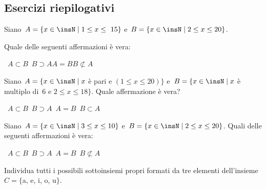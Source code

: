 \subsection{Esercizi riepilogativi}

\begin{esercizio}
\label{ese:\thechapter.92}
Siano~$A=\{x\in\insN\mid 1\le x\le~15\}$ e~$B=\{x\in\insN\mid 2\le x\le 20\}$.
\begin{center}

\end{center}
Quale delle seguenti affermazioni è vera:
\begin{center}
\boxA\quad~$A\subset B$\quad\boxB\quad~$B\supset A$\quad\boxC\quad$A=B$\quad\boxD\quad$B\not\subset A$
\end{center}
\end{esercizio}

\begin{esercizio}
\label{ese:\thechapter.93}
 Siano~$A=\{x\in\insN\mid x$ è pari e $(1\le x\le 20)\}$ e~$B=\{x\in\insN\mid x$ è multiplo di~6 e $2\le x\le 18\}$.
Quale affermazione è vera?
\begin{center}
 \boxA\quad~$A\subset B$\quad\boxB\quad~$B\supset A$\quad\boxC\quad~$A=B$\quad\boxD\quad~$B\subset A$
\end{center}
\end{esercizio}

\begin{esercizio}
\label{ese:\thechapter.94}
Siano~$A=\{x\in\insN\mid 3\le x\le 10\}$ e~$B=\{x\in\insN\mid 2\le x\le 20\}$.
Quali delle seguenti affermazioni è vera:
\begin{center}
 \boxA\quad~$A\subset B$\quad\boxB\quad~$B\supset A$\quad\boxC\quad~$A=B$\quad\boxD\quad~$B\not\subset A$
\end{center}
\end{esercizio}

\begin{esercizio}
\label{ese:\thechapter.95}
Individua tutti i possibili sottoinsiemi propri formati da tre elementi dell'insieme~$C=\{$a, e, i, o, u$\}$.
\end{esercizio}

